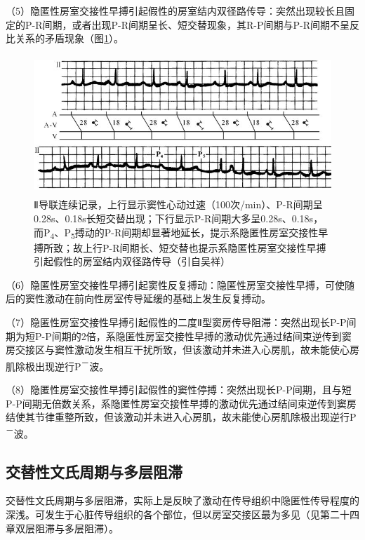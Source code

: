 （5）隐匿性房室交接性早搏引起假性的房室结内双径路传导：突然出现较长且固定的P-R间期，或者出现P-R间期呈长、短交替现象，其R-P间期与P-R间期不呈反比关系的矛盾现象（图\ref{fig35-17}）。

\begin{figure}[!htbp]
 \centering
 \includegraphics[width=4.79167in,height=2.07292in]{./images/Image00570.jpg}
 \captionsetup{justification=centering}
 \caption{Ⅱ导联连续记录，上行显示窦性心动过速（100次/min）、P-R间期呈0.28s、0.18s长短交替出现；下行显示P-R间期大多呈0.28s、0.18s，而P\textsubscript{4}、P\textsubscript{5}搏动的P-R间期却显著地延长，提示系隐匿性房室交接性早搏所致；故上行P-R间期长、短交替也提示系隐匿性房室交接性早搏引起假性的房室结内双径路传导（引自吴祥）}
 \label{fig35-17}
  \end{figure} 


（6）隐匿性房室交接性早搏引起窦性反复搏动：隐匿性房室交接性早搏，可使随后的窦性激动在前向性房室传导延缓的基础上发生反复搏动。

（7）隐匿性房室交接性早搏引起假性的二度Ⅱ型窦房传导阻滞：突然出现长P-P间期为短P-P间期的2倍，系隐匿性房室交接性早搏的激动优先通过结间束逆传到窦房交接区与窦性激动发生相互干扰所致，但该激动并未进入心房肌，故未能使心房肌除极出现逆行P\textsuperscript{－}波。

（8）隐匿性房室交接性早搏引起假性的窦性停搏：突然出现长P-P间期，且与短P-P间期无倍数关系，系隐匿性房室交接性早搏的激动优先通过结间束逆传到窦房结使其节律重整所致，但该激动并未进入心房肌，故未能使心房肌除极出现逆行P\textsuperscript{－}波。

\protect\hypertarget{text00042.htmlux5cux23subid460}{}{}

\subsection{交替性文氏周期与多层阻滞}

交替性文氏周期与多层阻滞，实际上是反映了激动在传导组织中隐匿性传导程度的深浅。可发生于心脏传导组织的各个部位，但以房室交接区最为多见（见第二十四章双层阻滞与多层阻滞）。

